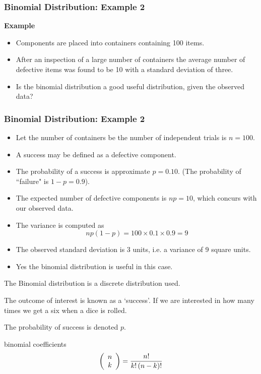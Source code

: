 \documentclass[IntroMain.tex]{subfiles}
\begin{document}
\begin{frame}
	\frametitle{Binomial Distribution: Example 2}
	\textbf{Example}
	\begin{itemize}
		\item Components are placed into containers containing 100 items.
		\item After an inspection of a large number of containers the average number of defective items was found to be 10 with a standard deviation of three.
		\item Is the binomial distribution a good useful distribution, given the observed data?
	\end{itemize}
\end{frame}
\begin{frame}
	\frametitle{Binomial Distribution: Example 2}
	
	\begin{itemize}
		\item Let the number of containers be the number of independent trials is $n=100$.
		\item A success may be defined as a defective component.
		\item The probability of a success is approximate $p=0.10$. (The probability of ``failure" is $1-p=0.9$).
		\item The expected number of defective components is $np=10$, which concurs with our observed data.
		\item The variance is computed as \[np(1-p) = 100 \times 0.1 \times 0.9 = 9\]
		\item The observed standard deviation is 3 units, i.e. a variance of 9 square units.
		\item Yes the binomial distribution is useful in this case.
	\end{itemize}
\end{frame}
\begin{frame}
	The Binomial distribution is a discrete distribution used.
	
	
	The outcome of interest is known as a `success'. If we are
	interested in how many times we get a six when a dice is rolled.
	
	The probability of success is denoted $p$.
	
	binomial coefficients
	\[
	\left( {\begin{array}{*{20}c} n \\ k \\ \end{array}} \right) =
	\frac{{n!}}{{k!\left( {n - k} \right)!}} \]
\end{frame}
\end{document}
